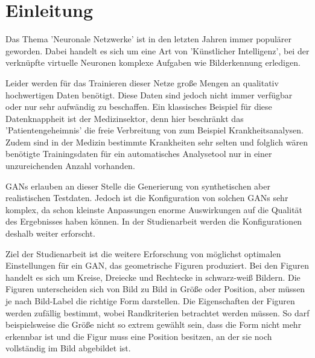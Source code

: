 \chapter{Einleitung}

Das Thema 'Neuronale Netzwerke' ist in den letzten Jahren immer populärer geworden.
Dabei handelt es sich um eine Art von 'Künstlicher Intelligenz', bei der verknüpfte virtuelle Neuronen komplexe Aufgaben wie Bilderkennung erledigen.

Leider werden für das Trainieren dieser Netze große Mengen an qualitativ hochwertigen Daten benötigt.
Diese Daten sind jedoch nicht immer verfügbar oder nur sehr aufwändig zu beschaffen.
Ein klassisches Beispiel für diese Datenknappheit ist der Medizinsektor, denn hier beschränkt das 'Patientengeheimnis' die freie Verbreitung von zum Beispiel Krankheitsanalysen.
Zudem sind in der Medizin bestimmte Krankheiten sehr selten und folglich wären benötigte Trainingsdaten für ein automatisches Analysetool nur in einer unzureichenden Anzahl vorhanden.

GANs erlauben an dieser Stelle die Generierung von synthetischen aber realistischen Testdaten.
Jedoch ist die Konfiguration von solchen GANs sehr komplex, da schon kleinste Anpassungen enorme Auswirkungen auf die Qualität des Ergebnisses haben können.
In der Studienarbeit werden die Konfigurationen deshalb weiter erforscht.
\newline

Ziel der Studienarbeit ist die weitere Erforschung von möglichst optimalen Einstellungen für ein GAN, das geometrische Figuren produziert.
Bei den Figuren handelt es sich um Kreise, Dreiecke und Rechtecke in schwarz-weiß Bildern.
Die Figuren unterscheiden sich von Bild zu Bild in Größe oder Position, aber müssen je nach Bild-Label die richtige Form darstellen.
Die Eigenschaften der Figuren werden zufällig bestimmt, wobei Randkriterien betrachtet werden müssen.
So darf beispielsweise die Größe nicht so extrem gewählt sein, dass die Form nicht mehr erkennbar ist und die Figur muss eine Position besitzen, an der sie noch vollständig im Bild abgebildet ist.
